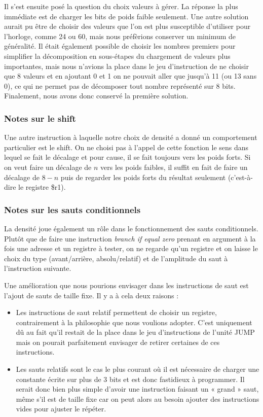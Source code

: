 \documentclass{article}
\begin{document}
Il s'est ensuite posé la question du choix valeurs à gérer. La réponse la plus immédiate
est de charger les bits de poids faible seulement. Une autre solution aurait
pu être de choisir des valeurs que l'on est plus susceptible d'utiliser pour l'horloge,
comme 24 ou 60, mais nous préfèrions conserver un minimum de généralité. Il était
également possible de choisir les nombres premiers pour simplifier la décomposition
en sous-étapes du chargement de valeurs plus importantes, mais nous n'avions la place
dans le jeu d'instruction de ne choisir que 8 valeurs et en ajoutant 0 et 1 on ne
pouvait aller que jusqu'à 11 (ou 13 sans 0), ce qui ne permet pas de décomposer
tout nombre représenté sur 8 bits. Finalement, nous avons donc conservé la première
solution.

\subsubsection{Notes sur le shift}
Une autre instruction à laquelle notre choix de densité a donné un comportement
particulier est le shift. On ne choisi pas à l'appel de cette fonction le sens dans
lequel se fait le décalage et pour cause, il se fait toujours vers les poids forts.
Si on veut faire un décalage de $n$ vers les poids faibles, il suffit en fait de
faire un décalage de $8 - n$ puis de regarder les poids forts du résultat seulement
(c'est-à-dire le registre \$r1).

\subsubsection{Notes sur les sauts conditionnels}
La densité joue également un rôle dans le fonctionnement des sauts conditionnels.
Plutôt que de faire une instruction \emph{branch if equal zero} prenant en argument
à la fois une adresse et un registre à tester, on ne regarde qu'un registre et on
laisse le choix du type (avant/arrière, absolu/relatif) et de l'amplitude du saut
à l'instruction suivante.

Une amélioration que nous pourions envisager dans les instructions de saut est
l'ajout de sauts de taille fixe. Il y a à cela deux raisons :
\begin{itemize}
  \item Les instructions de saut relatif permettent de choisir un registre, contrairement
        à la philosophie que nous voulions adopter. C'est uniquement dû au fait qu'il
        restait de la place dans le jeu d'instructions de l'unité JUMP mais on pourait
        parfaitement envisager de retirer certaines de ces instructions.
  \item Les sauts relatifs sont le cas le plus courant où il est nécessaire de charger
        une constante écrite sur plus de 3 bits et est donc fastidieux à programmer.
        Il serait donc bien plus simple d'avoir une instruction faisant un « grand »
        saut, même s'il est de taille fixe car on peut alors au besoin ajouter des
        instructions vides pour ajuster le répéter.
\end{itemize}
\end{document}
